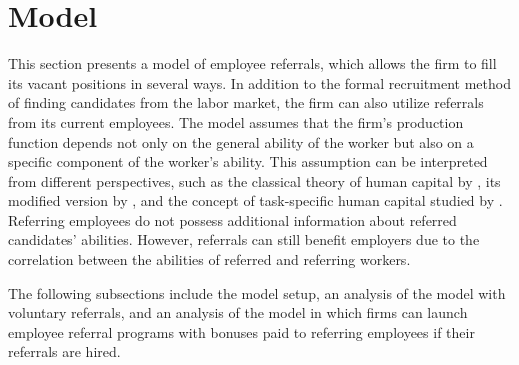 \documentclass[12pt]{article}
\begin{document}



\section{Model} \label{sec:model}
This section presents a model of employee referrals, which allows the firm to fill its vacant positions in several ways. In addition to the formal recruitment method of finding candidates from the labor market, the firm can also utilize referrals from its current employees. The model assumes that the firm's production function depends not only on the general ability of the worker but also on a specific component of the worker's ability. This assumption can be interpreted from different perspectives, such as the classical theory of human capital by \cite{becker1962investment}, its modified version by \cite{lazear2009firm}, and the concept of task-specific human capital studied by \cite{gibbons2004task}. Referring employees do not possess additional information about referred candidates' abilities. However, referrals can still benefit employers due to the correlation between the abilities of referred and referring workers. 

The following subsections include the model setup, an analysis of the model with voluntary referrals, and an analysis of the model in which firms can launch employee referral programs with bonuses paid to referring employees if their referrals are hired.
\end{document}
